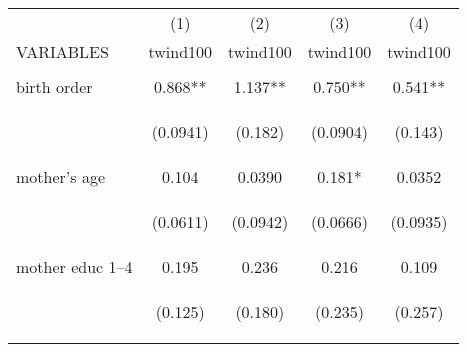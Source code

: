 \documentclass[]{article}
\begin{document}
\begin{center}
\begin{tabular}{lcccc} \hline
 & (1) & (2) & (3) & (4) \\
VARIABLES & twind100 & twind100 & twind100 & twind100 \\ \hline
\vspace{4pt} & \begin{footnotesize}\end{footnotesize} & \begin{footnotesize}\end{footnotesize} & \begin{footnotesize}\end{footnotesize} & \begin{footnotesize}\end{footnotesize} \\
birth order & 0.868** & 1.137** & 0.750** & 0.541** \\
\vspace{4pt} & \begin{footnotesize}(0.0941)\end{footnotesize} & \begin{footnotesize}(0.182)\end{footnotesize} & \begin{footnotesize}(0.0904)\end{footnotesize} & \begin{footnotesize}(0.143)\end{footnotesize} \\
mother's age & 0.104 & 0.0390 & 0.181* & 0.0352 \\
\vspace{4pt} & \begin{footnotesize}(0.0611)\end{footnotesize} & \begin{footnotesize}(0.0942)\end{footnotesize} & \begin{footnotesize}(0.0666)\end{footnotesize} & \begin{footnotesize}(0.0935)\end{footnotesize} \\
mother educ 1--4 & 0.195 & 0.236 & 0.216 & 0.109 \\
\vspace{4pt} & \begin{footnotesize}(0.125)\end{footnotesize} & \begin{footnotesize}(0.180)\end{footnotesize} & \begin{footnotesize}(0.235)\end{footnotesize} & \begin{footnotesize}(0.257)\end{footnotesize} \\

\end{tabular}
\end{center}
\end{document}
